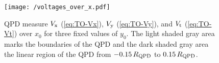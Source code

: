 \begin{figure}[tbp]
  \centering
  \texttt{[image: /voltages\_over\_x.pdf]}
  \caption{QPD measure $V_{\mathrm{x}}$ (\cref{eq:TO-Vx}), $V_{\mathrm{y}}$
    (\cref{eq:TO-Vy}), and $V_{\mathrm{t}}$ (\cref{eq:TO-Vt}) over $x_{0}$ for 
  three fixed values of $y_{0}$. The light shaded gray area marks the 
boundaries of the QPD and the dark shaded gray area the linear region of the 
QPD from $-0.15\,R_{\mathrm{QPD}}$ to $0.15\,R_{\mathrm{QPD}}$.}
  \label{fig:TO-voltages_over_x}
\end{figure}
